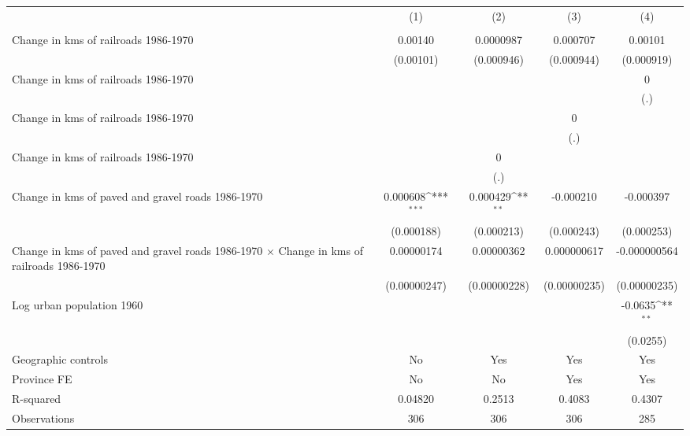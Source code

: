 {
\def\sym#1{\ifmmode^{#1}\else\(^{#1}\)\fi}
\begin{tabular}{l*{4}{c}}
\hline\hline
                &\multicolumn{1}{c}{(1)}&\multicolumn{1}{c}{(2)}&\multicolumn{1}{c}{(3)}&\multicolumn{1}{c}{(4)}\\
                &\multicolumn{1}{c}{}&\multicolumn{1}{c}{}&\multicolumn{1}{c}{}&\multicolumn{1}{c}{}\\
\hline
Change in kms of railroads 1986-1970&  0.00140         &0.0000987         & 0.000707         &  0.00101         \\
                &(0.00101)         &(0.000946)         &(0.000944)         &(0.000919)         \\
[1em]
Change in kms of railroads 1986-1970&                  &                  &                  &        0         \\
                &                  &                  &                  &      (.)         \\
[1em]
Change in kms of railroads 1986-1970&                  &                  &        0         &                  \\
                &                  &                  &      (.)         &                  \\
[1em]
Change in kms of railroads 1986-1970&                  &        0         &                  &                  \\
                &                  &      (.)         &                  &                  \\
[1em]
Change in kms of paved and gravel roads 1986-1970& 0.000608\sym{***}& 0.000429\sym{**} &-0.000210         &-0.000397         \\
                &(0.000188)         &(0.000213)         &(0.000243)         &(0.000253)         \\
[1em]
Change in kms of paved and gravel roads 1986-1970 $\times$ Change in kms of railroads 1986-1970&0.00000174         &0.00000362         &0.000000617         &-0.000000564         \\
                &(0.00000247)         &(0.00000228)         &(0.00000235)         &(0.00000235)         \\
[1em]
Log urban population 1960&                  &                  &                  &  -0.0635\sym{**} \\
                &                  &                  &                  & (0.0255)         \\
\hline
Geographic controls&       No         &      Yes         &      Yes         &      Yes         \\
Province FE     &       No         &       No         &      Yes         &      Yes         \\
R-squared       &  0.04820         &   0.2513         &   0.4083         &   0.4307         \\
Observations    &      306         &      306         &      306         &      285         \\
\hline\hline
\end{tabular}
}
